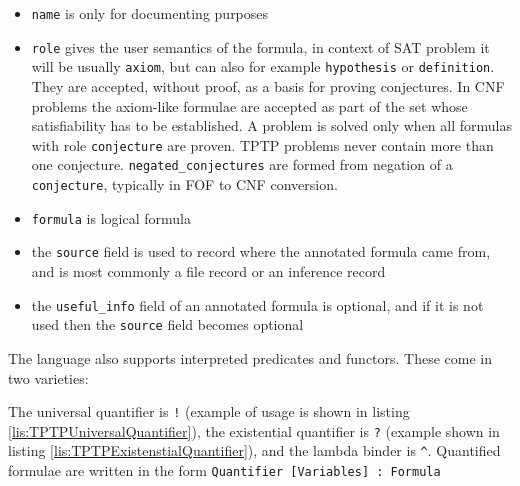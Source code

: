 \begin{itemize}
  \item \texttt{name} is only for documenting purposes
  \item \texttt{role} gives the user semantics of the formula, in context of SAT problem it will be usually \texttt{axiom}, but can also for example \texttt{hypothesis} or \texttt{definition}. They are accepted, without proof, as a basis for proving conjectures. In CNF problems the axiom-like formulae are accepted as part of the set whose satisfiability has to be established. A problem is solved only when all formulas with role \texttt{conjecture} are proven. TPTP problems never contain more than one conjecture. \texttt{negated_conjectures} are formed from negation of a \texttt{conjecture}, typically in FOF to CNF conversion.
  \item \texttt{formula} is logical formula
  \item the \texttt{source} field is used to record where the annotated formula came from, and is most commonly a file record or an inference record
  \item the \texttt{useful_info} field of an annotated formula is optional, and if it is not used then the \texttt{source} field becomes optional
\end{itemize}

The language also supports interpreted predicates and functors. These come in two varieties: 

The universal quantifier is \texttt{!} (example of usage is shown in listing \ref{lis:TPTPUniversalQuantifier}), the existential quantifier is \texttt{?} (example shown in listing \ref{lis:TPTPExistenstialQuantifier}), and the lambda binder is \texttt{^}. Quantified formulae are written in the form \texttt{Quantifier [Variables] :  Formula}


